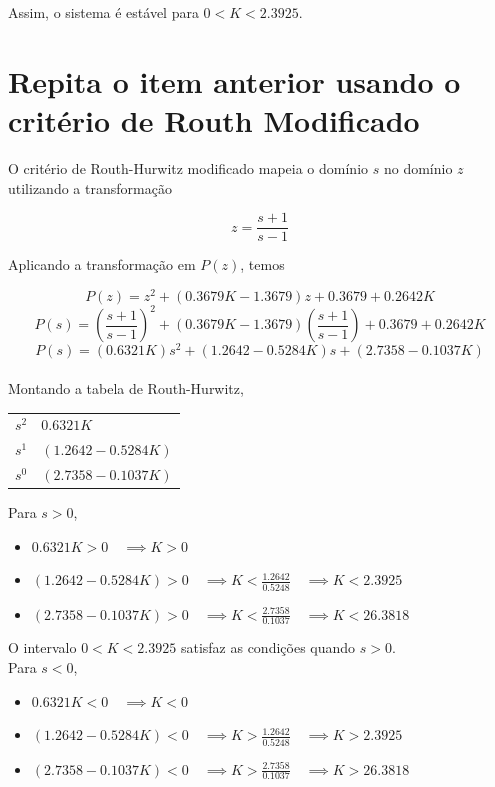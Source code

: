 \documentclass{article}
\begin{document}
    {Assim, o sistema é estável para $ 0 < K < 2.3925 $.}

\section{Repita o item anterior usando o critério de Routh Modificado}

    {O critério de Routh-Hurwitz modificado mapeia o domínio $s$ no domínio $z$
    utilizando a transformação}

    \[ z = \frac{s + 1}{s - 1} \]

    {Aplicando a transformação em $P(z)$, temos}

    \[ P(z) = z^2 + (0.3679K - 1.3679)z + 0.3679 + 0.2642K \]
    \[ P(s) = {\left(\frac{s + 1}{s - 1}\right)}^2 + (0.3679K - 1.3679)\left(\frac{s + 1}{s - 1}\right) + 0.3679 + 0.2642K \]
    \[ P(s) = (0.6321K)s^2 + (1.2642 - 0.5284K)s + (2.7358 - 0.1037K) \]\\

    {Montando a tabela de Routh-Hurwitz,}

    \begin{table}[H]
        \centering
        \begin{tabular}{ c | l }
            $s^2$ & $0.6321K$ \\
            $s^1$ & $(1.2642 - 0.5284K)$ \\
            $s^0$ & $(2.7358 - 0.1037K)$ \\
        \end{tabular}
    \end{table}

    {Para $s > 0$,}

    \begin{itemize}
        \item $ 0.6321K > 0 \quad \implies K > 0 $
        \item $(1.2642 - 0.5284K) > 0 \quad \implies K < \frac{1.2642}{0.5248} \quad \implies K < 2.3925 $
        \item $(2.7358 - 0.1037K) > 0 \quad \implies K < \frac{2.7358}{0.1037} \quad \implies K < 26.3818 $
    \end{itemize}

    {O intervalo $ 0 < K < 2.3925 $ satisfaz as condições quando $s > 0$.}\\

    {Para $s < 0$,}

    \begin{itemize}
        \item $ 0.6321K < 0 \quad \implies K < 0 $
        \item $(1.2642 - 0.5284K) < 0 \quad \implies K > \frac{1.2642}{0.5248} \quad \implies K > 2.3925 $
        \item $(2.7358 - 0.1037K) < 0 \quad \implies K > \frac{2.7358}{0.1037} \quad \implies K > 26.3818 $
    \end{itemize}
\end{document}
